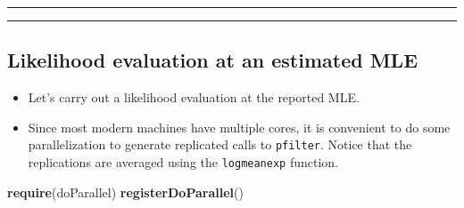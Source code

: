 \documentclass[]{article}
\newenvironment{Shaded}{\begin{snugshade}}{\end{snugshade}}
\newcommand{\KeywordTok}[1]{\textcolor[rgb]{0.13,0.29,0.53}{\textbf{#1}}}
\newcommand{\DataTypeTok}[1]{\textcolor[rgb]{0.13,0.29,0.53}{#1}}
\newcommand{\DecValTok}[1]{\textcolor[rgb]{0.00,0.00,0.81}{#1}}
\newcommand{\StringTok}[1]{\textcolor[rgb]{0.31,0.60,0.02}{#1}}
\newcommand{\OtherTok}[1]{\textcolor[rgb]{0.56,0.35,0.01}{#1}}
\newcommand{\OperatorTok}[1]{\textcolor[rgb]{0.81,0.36,0.00}{\textbf{#1}}}
\newcommand{\NormalTok}[1]{#1}
\begin{document}
\begin{center}\rule{0.5\linewidth}{\linethickness}\end{center}

\begin{center}\rule{0.5\linewidth}{\linethickness}\end{center}

\subsection{Likelihood evaluation at an estimated
MLE}\label{likelihood-evaluation-at-an-estimated-mle}

\begin{itemize}
\item
  Let's carry out a likelihood evaluation at the reported MLE.
\item
  Since most modern machines have multiple cores, it is convenient to do
  some parallelization to generate replicated calls to \texttt{pfilter}.
  Notice that the replications are averaged using the
  \texttt{logmeanexp} function.
\end{itemize}

\begin{Shaded}
\begin{Highlighting}[]
\KeywordTok{require}\NormalTok{(doParallel)}
\KeywordTok{registerDoParallel}\NormalTok{()}
\end{Highlighting}
\end{Shaded}

\begin{Shaded}
\end{Shaded}
\end{document}
